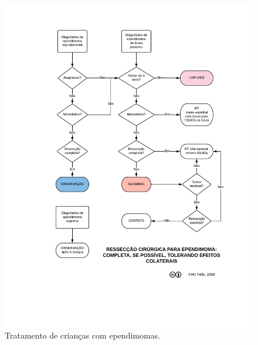 \documentclass[11pt,a4paper,oldfontcommands]{memoir}
\begin{document}
\begin{figure}[!htb]
\includegraphics[scale=0.87,trim = 18mm 30mm 15mm 12mm,clip]{fig/fig4.pdf}
\caption{Tratamento de crianças com ependimomas.}
\end{figure}
\end{document}
